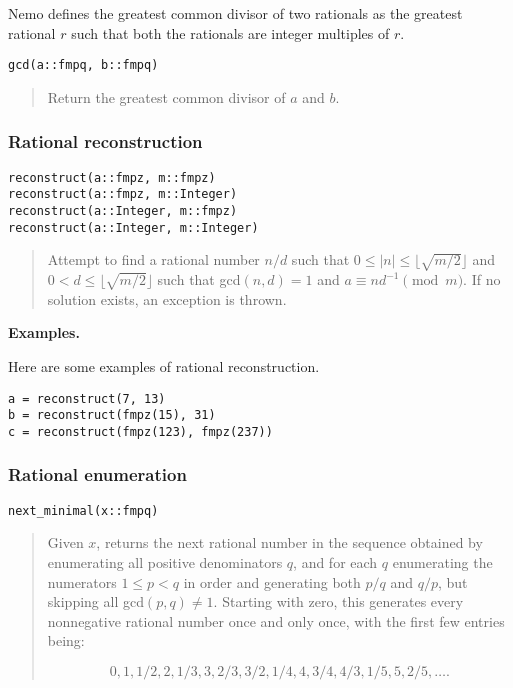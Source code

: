 \documentclass[a4paper,10pt]{article}
\newcommand{\desc}[1]{\vspace{-3mm}\begin{quote}#1\end{quote}}
\begin{document}
{{Nemo defines the greatest common divisor of two rationals as the greatest rational $r$
such that both the rationals are integer multiples of $r$.

\begin{lstlisting}
gcd(a::fmpq, b::fmpq)
\end{lstlisting}

\desc{Return the greatest common divisor of $a$ and $b$.}

\subsubsection{Rational reconstruction}

\begin{lstlisting}
reconstruct(a::fmpz, m::fmpz)
reconstruct(a::fmpz, m::Integer)
reconstruct(a::Integer, m::fmpz)
reconstruct(a::Integer, m::Integer)
\end{lstlisting}

\desc{Attempt to find a rational number $n/d$ such that 
$0 \leq |n| \leq \lfloor\sqrt{m/2}\rfloor$ and 
$0 < d \leq \lfloor\sqrt{m/2}\rfloor$ such that gcd$(n, d) = 1$ and
$a \equiv nd^{-1} \pmod{m}$. If no solution exists, an exception is thrown.}

\textbf{Examples.}

Here are some examples of rational reconstruction.

\begin{lstlisting}
a = reconstruct(7, 13)
b = reconstruct(fmpz(15), 31)
c = reconstruct(fmpz(123), fmpz(237))
\end{lstlisting}

\subsubsection{Rational enumeration}

\begin{lstlisting}
next_minimal(x::fmpq)
\end{lstlisting}

\desc{Given $x$, returns the next rational number in the sequence obtained by
enumerating all positive denominators $q$, and for each $q$ enumerating
the numerators $1 \le p < q$ in order and generating both $p/q$ and $q/p$,
but skipping all gcd$(p,q) \neq 1$. Starting with zero, this generates
every nonnegative rational number once and only once, with the first
few entries being:

$$0, 1, 1/2, 2, 1/3, 3, 2/3, 3/2, 1/4, 4, 3/4, 4/3, 1/5, 5, 2/5, \ldots.$$

}}}
\end{document}
